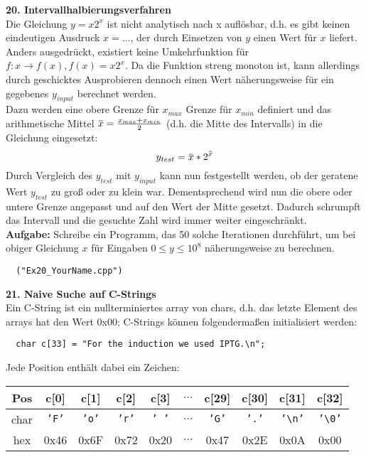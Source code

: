 \documentclass[paper=A4, pagesize, DIV=calc, smallheadings,
fontsize=11pt, expansion=false]{scrreprt}
\newcommand{\overbar}[1]{\mkern 1.5mu\overline{\mkern-1.5mu#1\mkern-1.5mu}\mkern 1.5mu}
\begin{document}
\textbf{20. Intervallhalbierungsverfahren}\\
  Die Gleichung $ y = x2^x$ ist nicht analytisch nach x auflösbar, d.h. es gibt keinen eindeutigen Ausdruck 
$x = \dots$, der durch Einsetzen von $y$ einen Wert für $x$ liefert. 
Anders ausgedrückt, existiert keine Umkehrfunktion für $f:x \longrightarrow f(x), f(x) = x2^x$.
 Da die Funktion streng monoton ist, kann allerdings durch geschicktes Ausprobieren dennoch einen Wert näherungsweise 
für ein gegebenes $y_{input}$ berechnet werden.\\
Dazu werden eine obere Grenze für $x_{max}$ Grenze für $x_{min}$ definiert 
und das arithmetische Mittel $\overbar{x} = \frac{x_{max} + x_{min}}{2}$ (d.h. die Mitte des Intervalls) in die Gleichung eingesetzt:
\[y_{test} = \overbar{x} * 2^{\overbar{x}}\]
Durch Vergleich des $y_{test}$ mit $y_{input}$ kann nun festgestellt werden, ob der geratene Wert 
$y_{test}$ zu groß oder zu klein war. Dementsprechend wird nun die obere oder untere Grenze angepasst und auf den Wert der Mitte gesetzt. 
Dadurch schrumpft das Intervall und die gesuchte Zahl wird immer weiter eingeschränkt.\\
\textbf{Aufgabe:} Schreibe ein Programm, das 50 solche Iterationen durchführt, um bei obiger Gleichung $x$ für Eingaben $0 \le y \le 10^8$ näherungsweise zu berechnen.
\normalsize
\begin{verbatim}
  ("Ex20_YourName.cpp")
\end{verbatim}    
\textbf{21. Naive Suche auf C-Strings} \\
  Ein C-String ist ein nullterminiertes array von chars, d.h. das letzte Element des arrays hat den Wert 0x00;
  C-Strings können folgendermaßen initialisiert werden:
  \begin{verbatim}
  char c[33] = "For the induction we used IPTG.\n";
\end{verbatim}
  Jede Position enthält dabei ein Zeichen:\\
\begin{center}
\begin{tabular}[H]{|c|c|c|c|c|c|c|c|c|c|}
\hline
Pos  & c[0]          & c[1]          & c[2]          & c[3]           & $\hdots$ & c[29]        & c[30]        & c[31]                       & c[32]                       \\ \hline
char & \texttt{'F'}  & \texttt{'o'}  & \texttt{'r'}  & \texttt{' '}   & $\hdots$ & \texttt{'G'} & \texttt{'.'} & \texttt{'\textbackslash n'} & \texttt{'\textbackslash 0'} \\ \hline
hex  &  0x46         & 0x6F          & 0x72          & 0x20           & $\hdots$ & 0x47         & 0x2E         & 0x0A                        & 0x00                        \\ \hline
\end{tabular}\vspace{0.5ex}
\end{center}
\end{document}
